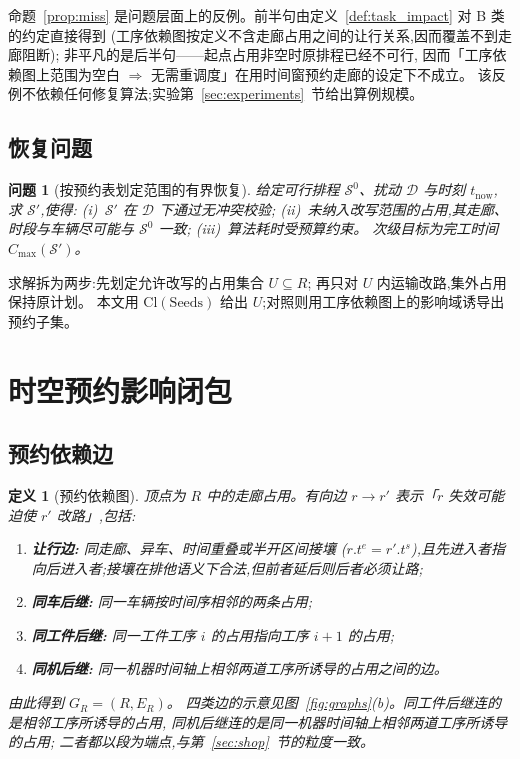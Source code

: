 \documentclass[manuscript,screen,review]{acmart}
\newtheorem{definition}{定义}
\newtheorem{problem}{问题}
\begin{document}
命题~\ref{prop:miss} 是问题层面上的反例。前半句由定义~\ref{def:task_impact} 对 B 类的约定直接得到
(工序依赖图按定义不含走廊占用之间的让行关系,因而覆盖不到走廊阻断);
非平凡的是后半句——起点占用非空时原排程已经不可行,
因而「工序依赖图上范围为空白 \(\Rightarrow\) 无需重调度」在用时间窗预约走廊的设定下不成立。
该反例不依赖任何修复算法;实验第~\ref{sec:experiments}~节给出算例规模。

\subsection{恢复问题}
\label{sec:recovery_problem}

\begin{problem}[按预约表划定范围的有界恢复]
\label{prob:recovery}
给定可行排程 \(\mathcal{S}^0\)、扰动 \(\mathcal{D}\) 与时刻 \(t_{\mathrm{now}}\),
求 \(\mathcal{S}'\),使得:
(i)~\(\mathcal{S}'\) 在 \(\mathcal{D}\) 下通过无冲突校验;
(ii)~未纳入改写范围的占用,其走廊、时段与车辆尽可能与 \(\mathcal{S}^0\) 一致;
(iii)~算法耗时受预算约束。
次级目标为完工时间 \(C_{\max}(\mathcal{S}')\)。
\end{problem}

求解拆为两步:先划定允许改写的占用集合 \(U\subseteq R\);
再只对 \(U\) 内运输改路,集外占用保持原计划。
本文用 \(\mathrm{Cl}(\mathrm{Seeds})\) 给出 \(U\);对照则用工序依赖图上的影响域诱导出预约子集。

\section{时空预约影响闭包}
\label{sec:strc}

\subsection{预约依赖边}
\label{sec:closure_def}

\begin{definition}[预约依赖图]
\label{def:dep}
顶点为 \(R\) 中的走廊占用。有向边 \(r\to r'\) 表示「\(r\) 失效可能迫使 \(r'\) 改路」,包括:
\begin{enumerate}[leftmargin=1.4em,itemsep=0.15em]
\item \textbf{让行边:} 同走廊、异车、时间重叠\emph{或半开区间接壤}
(\(r.t^e=r'.t^s\)),且先进入者指向后进入者;接壤在排他语义下合法,但前者延后则后者必须让路;
\item \textbf{同车后继:} 同一车辆按时间序相邻的两条占用;
\item \textbf{同工件后继:} 同一工件工序 \(i\) 的占用指向工序 \(i+1\) 的占用;
\item \textbf{同机后继:} 同一机器时间轴上相邻两道工序所诱导的占用之间的边。
\end{enumerate}
由此得到 \(G_R=(R,E_R)\)。
四类边的示意见图~\ref{fig:graphs}(b)。同工件后继连的是相邻工序所诱导的占用,
同机后继连的是同一机器时间轴上相邻两道工序所诱导的占用;
二者都以段为端点,与第~\ref{sec:shop}~节的粒度一致。
\end{definition}
\end{document}
